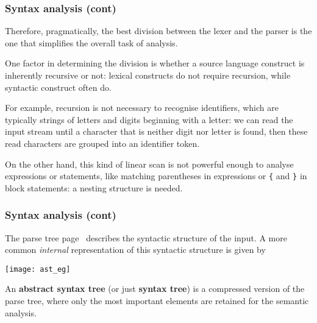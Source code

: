 % 
\begin{frame}[containsverbatim]
\frametitle{Syntax analysis (cont)}

Therefore, pragmatically, the best division between the lexer and the
parser is the one that simplifies the overall task of analysis.

\bigskip

One factor in determining the division is whether a source language
construct is inherently recursive or not: lexical constructs do not
require recursion, while syntactic construct often do.

\bigskip

For example, recursion is not necessary to recognise identifiers,
which are typically strings of letters and digits beginning with a
letter: we can read the input stream until a character that is neither
digit nor letter is found, then these read characters are grouped into
an identifier token.

\bigskip

On the other hand, this kind of linear scan is not powerful enough to
analyse expressions or statements, like matching parentheses in
expressions or \verb|{| and \verb|}| in block statements: a nesting
structure is needed.

\end{frame}

% 
\begin{frame}
\frametitle{Syntax analysis (cont)}

\label{ast_eg}

The parse tree page~\pageref{parse_tree_eg} describes the syntactic
structure of the input. A more common \emph{internal} representation
of this syntactic structure is given by
\begin{center}
\texttt{[image: ast\_eg]}
\end{center}
An \textbf{abstract syntax tree} (or just \textbf{syntax tree}) is a
compressed version of the parse tree, where only the most important
elements are retained for the semantic analysis.

\end{frame}

